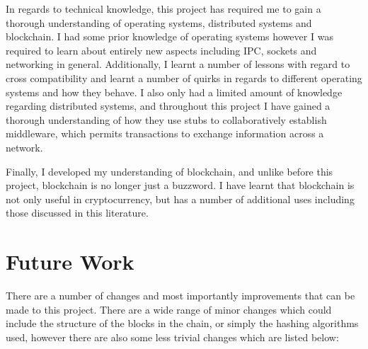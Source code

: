 \documentclass[a4paper, 11pt]{report}
\begin{document}
In regards to technical knowledge, this project has required me to gain a thorough understanding of operating systems, distributed systems and \gls{blockchain}. I had some prior knowledge of operating systems however I was required to learn about entirely new aspects including \acrshort{IPC}, sockets and networking in general. Additionally, I learnt a number of lessons with regard to cross compatibility and learnt a number of quirks in regards to different operating systems and how they behave. I also only had a limited amount of knowledge regarding distributed systems, and throughout this project I have gained a thorough understanding of how they use \gls{stub}s to collaboratively establish \gls{middleware}, which permits transactions to exchange information across a network.

 Finally, I developed my understanding of \gls{blockchain}, and unlike before this project, \gls{blockchain} is no longer just a buzzword. I have learnt that \gls{blockchain} is not only useful in cryptocurrency, but has a number of additional uses including those discussed in this literature.

\section{Future Work}
There are a number of changes and most importantly improvements that can be made to this project. There are a wide range of minor changes which could include the structure of the blocks in the chain, or simply the \gls{hashing} algorithms used, however there are also some less trivial changes which are listed below:
\end{document}
